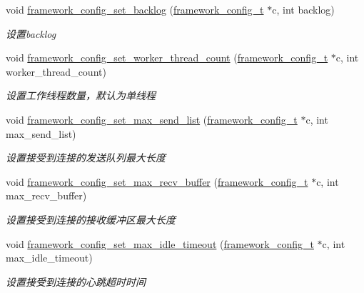 \begin{DoxyCompactItemize}
void \hyperlink{a00093_gafdcba98785a6e0c7729c14eac004c1e3_gafdcba98785a6e0c7729c14eac004c1e3}{framework\+\_\+config\+\_\+set\+\_\+backlog} (\hyperlink{a00047_a55b26efa9e6ee05514d087ba2593a54b_a55b26efa9e6ee05514d087ba2593a54b}{framework\+\_\+config\+\_\+t} $\ast$c, int backlog)
\begin{DoxyCompactList}\small\item\em 设置backlog \end{DoxyCompactList}\item 
void \hyperlink{a00093_ga46fc5d54c72138bced5ddd4068ef77e5_ga46fc5d54c72138bced5ddd4068ef77e5}{framework\+\_\+config\+\_\+set\+\_\+worker\+\_\+thread\+\_\+count} (\hyperlink{a00047_a55b26efa9e6ee05514d087ba2593a54b_a55b26efa9e6ee05514d087ba2593a54b}{framework\+\_\+config\+\_\+t} $\ast$c, int worker\+\_\+thread\+\_\+count)
\begin{DoxyCompactList}\small\item\em 设置工作线程数量，默认为单线程 \end{DoxyCompactList}\item 
void \hyperlink{a00093_ga6d3affd6639a3d75920197811c333fac_ga6d3affd6639a3d75920197811c333fac}{framework\+\_\+config\+\_\+set\+\_\+max\+\_\+send\+\_\+list} (\hyperlink{a00047_a55b26efa9e6ee05514d087ba2593a54b_a55b26efa9e6ee05514d087ba2593a54b}{framework\+\_\+config\+\_\+t} $\ast$c, int max\+\_\+send\+\_\+list)
\begin{DoxyCompactList}\small\item\em 设置接受到连接的发送队列最大长度 \end{DoxyCompactList}\item 
void \hyperlink{a00093_ga582e128041da47fa6578aa150b5a615a_ga582e128041da47fa6578aa150b5a615a}{framework\+\_\+config\+\_\+set\+\_\+max\+\_\+recv\+\_\+buffer} (\hyperlink{a00047_a55b26efa9e6ee05514d087ba2593a54b_a55b26efa9e6ee05514d087ba2593a54b}{framework\+\_\+config\+\_\+t} $\ast$c, int max\+\_\+recv\+\_\+buffer)
\begin{DoxyCompactList}\small\item\em 设置接受到连接的接收缓冲区最大长度 \end{DoxyCompactList}\item 
void \hyperlink{a00093_ga22047d5186ce58243e3c4308dd851ab6_ga22047d5186ce58243e3c4308dd851ab6}{framework\+\_\+config\+\_\+set\+\_\+max\+\_\+idle\+\_\+timeout} (\hyperlink{a00047_a55b26efa9e6ee05514d087ba2593a54b_a55b26efa9e6ee05514d087ba2593a54b}{framework\+\_\+config\+\_\+t} $\ast$c, int max\+\_\+idle\+\_\+timeout)
\begin{DoxyCompactList}\small\item\em 设置接受到连接的心跳超时时间 \end{DoxyCompactList}\end{DoxyCompactItemize}



